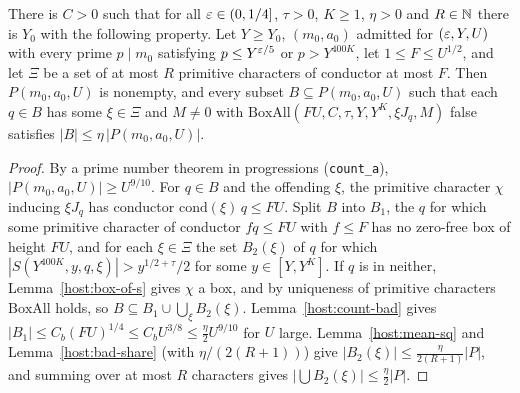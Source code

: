 \begin{lemma}\label{host:stage}
There is $C>0$ such that for all $\varepsilon\in(0,1/4]$, $\tau>0$, $K\ge1$,
$\eta>0$ and $R\in\mathbb{N}$ there is $Y_0$ with the following property. Let
$Y\ge Y_0$, $(m_0,a_0)$ admitted for $(\varepsilon,Y,U)$ with every prime
$p\mid m_0$ satisfying $p\le Y^{\varepsilon/5}$ or $p>Y^{400K}$, let $1\le F\le
U^{1/2}$, and let $\Xi$ be a set of at most $R$ primitive characters of
conductor at most $F$. Then $P(m_0,a_0,U)$ is nonempty, and every subset
$B\subseteq P(m_0,a_0,U)$ such that each $q\in B$ has some $\xi\in\Xi$ and
$M\ne0$ with $\mathrm{BoxAll}(FU,C,\tau,Y,Y^K,\xi J_q,M)$ false satisfies
$|B|\le\eta\,|P(m_0,a_0,U)|$.
\end{lemma}
\begin{proof}
By a prime number theorem in progressions (\texttt{count\_a}),
$|P(m_0,a_0,U)|\ge U^{9/10}$. For $q\in B$ and the offending $\xi$, the
primitive character $\chi$ inducing $\xi J_q$ has conductor
$\mathrm{cond}(\xi)\,q\le FU$. Split $B$ into $B_1$, the $q$ for which
some primitive character of conductor $fq\le FU$ with $f\le F$ has no
zero-free box of height $FU$, and for each $\xi\in\Xi$ the set $B_2(\xi)$
of $q$ for which $|S(Y^{400K},y,q,\xi)|>y^{1/2+\tau}/2$ for some
$y\in[Y,Y^K]$. If $q$ is in neither, Lemma~\ref{host:box-of-s} gives
$\chi$ a box, and by uniqueness of primitive characters
$\mathrm{BoxAll}$ holds, so $B\subseteq B_1\cup\bigcup_{\xi} B_2(\xi)$.
Lemma~\ref{host:count-bad} gives $|B_1|\le C_b(FU)^{1/4}\le
C_bU^{3/8}\le\frac\eta2U^{9/10}$ for $U$ large. Lemma~\ref{host:mean-sq}
and Lemma~\ref{host:bad-share} (with $\eta/(2(R+1))$) give
$|B_2(\xi)|\le\frac{\eta}{2(R+1)}|P|$, and summing over at most $R$
characters gives $|\bigcup B_2(\xi)|\le\frac\eta2|P|$.
\end{proof}

